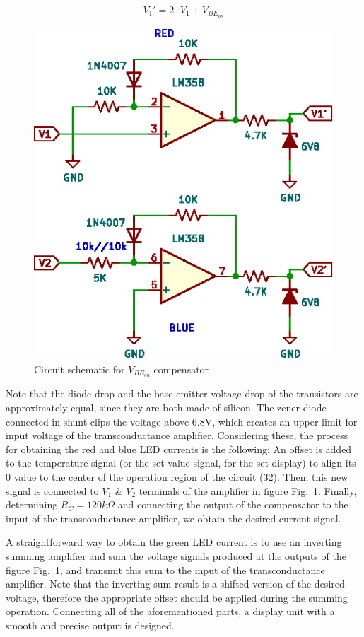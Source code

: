\documentclass[conference]{IEEEtran}
\begin{document}
\begin{equation}
V_{1}' = 2\cdot V_{1}+V_{BE_{on}}\label{drop_sub}
\end{equation}

\begin{figure}[h]
\centerline{\includegraphics[scale=1.0]{figures/display-diode-drop-subtractor.eps}}
\caption{Circuit schematic for $V_{BE_{on}}$ compensator}
\label{dropSubtracter}
\end{figure}

Note that the diode drop and the base emitter voltage drop of the transistors are approximately equal, since they are both made of silicon. The zener diode connected in shunt clips the voltage above 6.8V, which creates an upper limit for input voltage of the transconductance amplifier. Considering these, the process for obtaining the red and blue LED currents is the following: An offset is added to the temperature signal (or the set value signal, for the set display) to align its 0 value to the center of the operation region of the circuit (32\celsius). Then, this new signal is connected to $V_{1}$ \& $V_{2}$ terminals of the amplifier in figure Fig.~\ref{dropSubtracter}. Finally, determining $R_{C}=120k\Omega$ and connecting the output of the compensator to the input of the transconductance amplifier, we obtain the desired current signal.

A straightforward way to obtain the green LED current is to use an inverting summing amplifier and sum the voltage signals produced at the outputs of the figure Fig.~\ref{dropSubtracter}, and transmit this sum to the input of the transconductance amplifier. Note that the inverting sum result is a shifted version of the desired voltage, therefore the appropriate offset should be applied during the summing operation. Connecting all of the aforementioned parts, a display unit with a smooth and precise output is designed.
\end{document}
